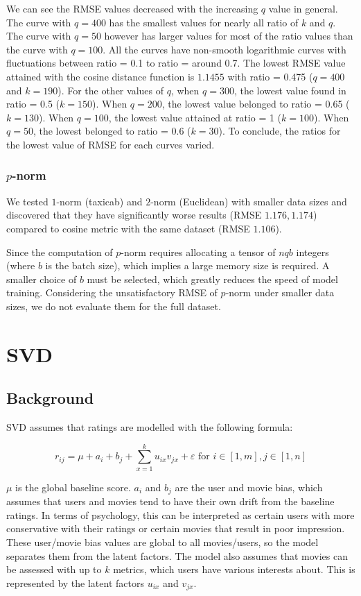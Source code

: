 \documentclass[final]{cvpr}
\begin{document}
We can see the RMSE values decreased with the increasing $q$ value in general.
The curve with $q = 400$ has the smallest values for nearly all ratio of $k$ and $q$.
The curve with $q = 50$ however has larger values for most of the ratio values than the curve with $q = 100$.
All the curves have non-smooth logarithmic curves with fluctuations between ratio = 0.1 to ratio = around 0.7. 
The lowest RMSE value attained with the cosine distance function is $1.1455$ with ratio = 0.475 ($q = 400$ and $k=190$).
For the other values of $q$, when $q = 300$, the lowest value found in ratio = 0.5 ($k = 150$).
When $q = 200$, the lowest value belonged to ratio = 0.65 ($k = 130$).
When $q = 100$, the lowest value attained at ratio = 1 ($k = 100$).
When $q = 50$, the lowest belonged to ratio = 0.6 ($k = 30$).
To conclude, the ratios for the lowest value of RMSE for each curves varied.

\subsubsection{$p$-norm}
We tested $1$-norm (taxicab) and $2$-norm (Euclidean) with smaller data sizes
and discovered that they have significantly worse results (RMSE $1.176, 1.174$)
compared to cosine metric with the same dataset (RMSE $1.106$).

Since the computation of $p$-norm requires allocating a tensor of $nqb$ integers
(where $b$ is the batch size), which implies a large memory size is required.
A smaller choice of $b$ must be selected, which greatly reduces the speed of model training.
Considering the unsatisfactory RMSE of $p$-norm under smaller data sizes,
we do not evaluate them for the full dataset.

\section{\ac{SVD}}
\subsection{Background}
SVD assumes that ratings are modelled with the following formula:

$$ r_{ij} = \mu + a_i + b_j + \sum_{x=1}^k u_{ix} v_{jx} + \varepsilon
\text{ for } i \in [1, m], j \in [1, n] $$

$\mu$ is the global baseline score.
$a_i$ and $b_j$ are the user and movie bias,
which assumes that users and movies tend to have their own drift from the baseline ratings.
In terms of psychology, this can be interpreted as
certain users with more conservative with their ratings
or certain movies that result in poor impression.
These user/movie bias values are global to all movies/users,
so the model separates them from the latent factors.
The model also assumes that movies can be assessed with up to $k$ metrics,
which users have various interests about.
This is represented by the latent factors $u_{ix}$ and $v_{jx}$.
\end{document}
